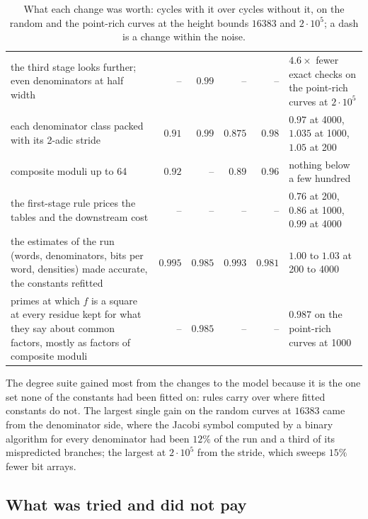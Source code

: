 \documentclass[12pt,a4paper,oneside]{amsart}
\begin{document}
\begin{table}[tbp]
\begin{tabular}{@{}P{7.3cm}rrrrP{3.8cm}@{}}
the third stage looks further; even denominators at half width & -- & $0.99$
  & -- & -- & $4.6\times$ fewer exact checks on the point-rich curves at
  $2\cdot10^5$ \\
each denominator class packed with its 2-adic stride & $0.91$ & $0.99$
  & $0.875$ & $0.98$ & $0.97$ at 4000, $1.035$ at 1000, $1.05$ at 200 \\
composite moduli up to 64 & $0.92$ & -- & $0.89$ & $0.96$ & nothing below a
  few hundred \\
the first-stage rule prices the tables and the downstream cost & -- & -- & --
  & -- & $0.76$ at 200, $0.86$ at 1000, $0.99$ at 4000 \\
the estimates of the run (words, denominators, bits per word, densities)
  made accurate, the constants refitted & $0.995$ & $0.985$ & $0.993$
  & $0.981$ & $1.00$ to $1.03$ at 200 to 4000 \\
primes at which $f$ is a square at every residue kept for what they say
  about common factors, mostly as factors of composite moduli & -- & $0.985$
  & -- & -- & $0.987$ on the point-rich curves at 1000 \\
\end{tabular}
\caption{What each change was worth: cycles with it over cycles without
it, on the random and the point-rich curves at the height bounds $16383$
and $2\cdot10^5$; a dash is a change within the noise.}\label{tab:worth}
\end{table}

The degree suite gained most from the changes to the model because it is
the one set none of the constants had been fitted on: rules carry over
where fitted constants do not. The largest single gain on the random curves
at $16383$ came from the denominator side, where the Jacobi symbol computed
by a binary algorithm for every denominator had been $12\%$ of the run and
a third of its mispredicted branches; the largest at $2\cdot10^5$ from the
stride, which sweeps $15\%$ fewer bit arrays.

\subsection{What was tried and did not pay}\label{app:declined}
\end{document}
